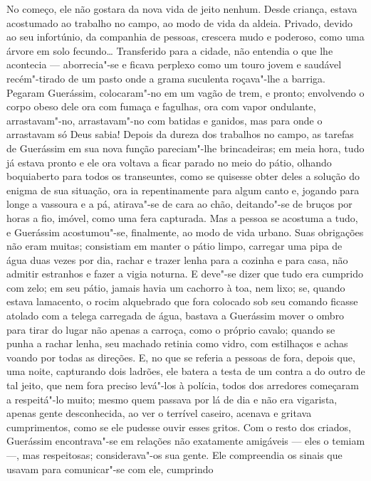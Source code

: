 No começo, ele não gostara da nova vida de jeito nenhum. Desde criança,
estava acostumado ao trabalho no campo, ao modo de vida da aldeia.
Privado, devido ao seu infortúnio, da companhia de pessoas, crescera
mudo e poderoso, como uma árvore em solo fecundo\ldots{} Transferido para a
cidade, não entendia o que lhe acontecia --- aborrecia"-se e ficava
perplexo como um touro jovem e saudável recém"-tirado de um pasto onde a
grama suculenta roçava"-lhe a barriga. Pegaram Guerássim, colocaram"-no em
um vagão de trem, e pronto; envolvendo o corpo obeso dele ora com fumaça
e fagulhas, ora com vapor ondulante, arrastavam"-no, arrastavam"-no com
batidas e ganidos, mas para onde o arrastavam só Deus sabia! Depois da
dureza dos trabalhos no campo, as tarefas de Guerássim em sua nova
função pareciam"-lhe brincadeiras; em meia hora, tudo já estava pronto e
ele ora voltava a ficar parado no meio do pátio, olhando boquiaberto
para todos os transeuntes, como se quisesse obter deles a solução do
enigma de sua situação, ora ia repentinamente para algum canto e,
jogando para longe a vassoura e a pá, atirava"-se de cara ao chão,
deitando"-se de bruços por horas a fio, imóvel, como uma fera capturada.
Mas a pessoa se acostuma a tudo, e Guerássim acostumou"-se, finalmente,
ao modo de vida urbano. Suas obrigações não eram muitas; consistiam em
manter o pátio limpo, carregar uma pipa de água duas vezes por dia,
rachar e trazer lenha para a cozinha e para casa, não admitir estranhos
e fazer a vigia noturna. E deve"-se dizer que tudo era cumprido com zelo;
em seu pátio, jamais havia um cachorro à toa, nem lixo; se, quando
estava lamacento, o rocim alquebrado que fora colocado sob seu comando
ficasse atolado com a telega carregada de água, bastava a Guerássim
mover o ombro para tirar do lugar não apenas a carroça, como o próprio
cavalo; quando se punha a rachar lenha, seu machado retinia como vidro,
com estilhaços e achas voando por todas as direções. E, no que se
referia a pessoas de fora, depois que, uma noite, capturando dois
ladrões, ele batera a testa de um contra a do outro de tal jeito, que nem
fora preciso levá"-los à polícia, todos dos arredores começaram a
respeitá"-lo muito; mesmo quem passava por lá de dia e não era vigarista,
apenas gente desconhecida, ao ver o terrível caseiro, acenava e gritava
cumprimentos, como se ele pudesse ouvir esses gritos. Com o resto dos
criados, Guerássim encontrava"-se em relações não exatamente amigáveis
--- eles o temiam ---, mas respeitosas; considerava"-os sua gente. Ele
compreendia os sinais que usavam para comunicar"-se com ele, cumprindo
